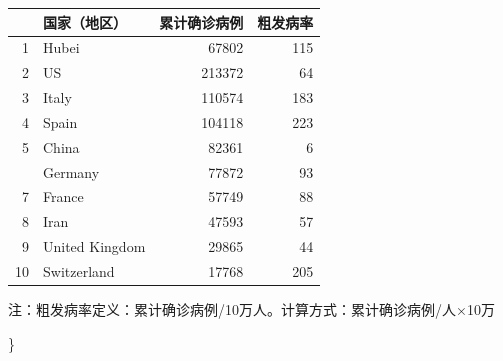 \documentclass[]{article}
\begin{document}
\begin{table}[!htb]
    \caption{确诊前十位国家}
      \centering \begin{table}[H]
\centering
\begin{tabular}{rlrr}
\toprule
  & 国家（地区） & 累计确诊病例 & 粗发病率\\
\midrule
\rowcolor{gray!6}  1 & Hubei & 67802 & 115\\
2 & US & 213372 & 64\\
\rowcolor{gray!6}  3 & Italy & 110574 & 183\\
4 & Spain & 104118 & 223\\
\rowcolor{gray!6}  5 & China & 82361 & 6\\
\addlinespace
6 & Germany & 77872 & 93\\
\rowcolor{gray!6}  7 & France & 57749 & 88\\
8 & Iran & 47593 & 57\\
\rowcolor{gray!6}  9 & United Kingdom & 29865 & 44\\
10 & Switzerland & 17768 & 205\\
\bottomrule
\end{tabular}
\end{table} \begin{tablenotes}
        \setfontsize\footnotesize{}
        \item 注：粗发病率定义：累计确诊病例/10万人。计算方式：累计确诊病例/⼈×10万  %
      \end{tablenotes}
    \end{table}

\}
\end{document}
